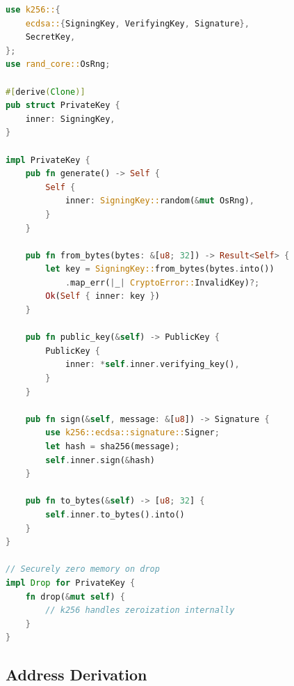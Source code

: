 \documentclass[11pt,twocolumn]{article}
\begin{document}
\begin{lstlisting}[language=Rust,caption=Key Types]
use k256::{
    ecdsa::{SigningKey, VerifyingKey, Signature},
    SecretKey,
};
use rand_core::OsRng;

#[derive(Clone)]
pub struct PrivateKey {
    inner: SigningKey,
}

impl PrivateKey {
    pub fn generate() -> Self {
        Self {
            inner: SigningKey::random(&mut OsRng),
        }
    }

    pub fn from_bytes(bytes: &[u8; 32]) -> Result<Self> {
        let key = SigningKey::from_bytes(bytes.into())
            .map_err(|_| CryptoError::InvalidKey)?;
        Ok(Self { inner: key })
    }

    pub fn public_key(&self) -> PublicKey {
        PublicKey {
            inner: *self.inner.verifying_key(),
        }
    }

    pub fn sign(&self, message: &[u8]) -> Signature {
        use k256::ecdsa::signature::Signer;
        let hash = sha256(message);
        self.inner.sign(&hash)
    }

    pub fn to_bytes(&self) -> [u8; 32] {
        self.inner.to_bytes().into()
    }
}

// Securely zero memory on drop
impl Drop for PrivateKey {
    fn drop(&mut self) {
        // k256 handles zeroization internally
    }
}
\end{lstlisting}

\subsection{Address Derivation}
\end{document}
